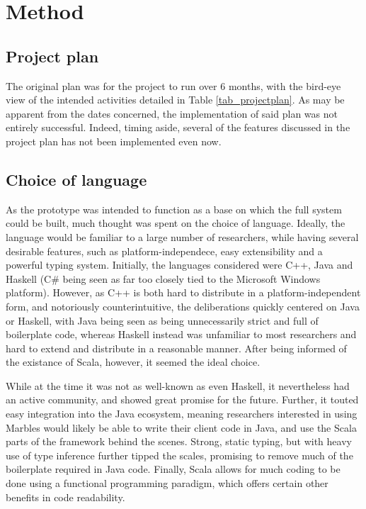 \section{Method}

\subsection{Project plan}

The original plan was for the project to run over 6 months, with the
bird-eye view of the intended activities detailed in Table
\ref{tab_projectplan}. As may be apparent from the dates concerned, the
implementation of said plan was not entirely successful. Indeed, timing
aside, several of the features discussed in the project plan has not been
implemented even now. 


\subsection{Choice of language}

As the prototype was intended to function as a base on which the full
system could be built, much thought was spent on the choice of language.
Ideally, the language would be familiar to a large number of researchers,
while having several desirable features, such as platform-independece, easy
extensibility and a powerful typing system. Initially, the languages
considered were C++, Java and Haskell (C\# being seen as far too closely
tied to the Microsoft Windows platform). However, as C++ is both hard to
distribute in a platform-independent form, and notoriously
counterintuitive, the deliberations quickly centered on Java or Haskell,
with Java being seen as being unnecessarily strict and full of boilerplate
code, whereas Haskell instead was unfamiliar to most researchers and hard
to extend and distribute in a reasonable manner. After being informed of
the existance of Scala, however, it seemed the ideal choice.

While at the time it was not as well-known as even Haskell, it nevertheless
had an active community, and showed great promise for the future. Further,
it touted easy integration into the Java ecosystem, meaning researchers
interested in using Marbles would likely be able to write their client code
in Java, and use the Scala parts of the framework behind the scenes.
Strong, static typing, but with heavy use of type inference further tipped
the scales, promising to remove much of the boilerplate required in Java
code. Finally, Scala allows for much coding to be done using a functional
programming paradigm, which offers certain other benefits in code
readability.


